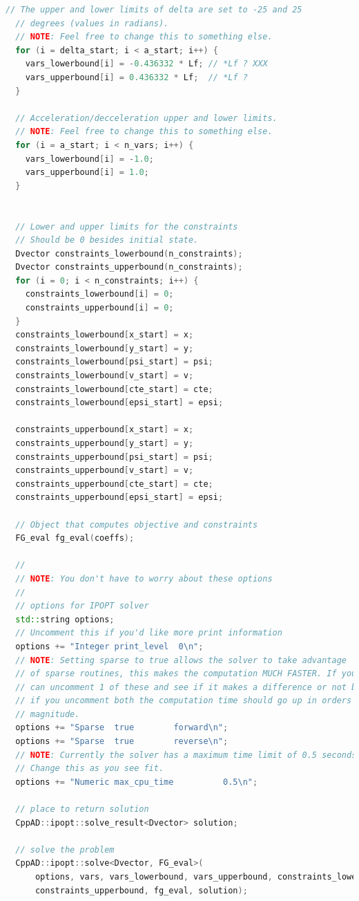 \documentclass[11pt]{article}
\begin{document}
\begin{lstlisting}[language=C++, caption={MPC solver with ipopt}]
  // The upper and lower limits of delta are set to -25 and 25
  // degrees (values in radians).
  // NOTE: Feel free to change this to something else.
  for (i = delta_start; i < a_start; i++) {
    vars_lowerbound[i] = -0.436332 * Lf; // *Lf ? XXX
    vars_upperbound[i] = 0.436332 * Lf;  // *Lf ?
  }

  // Acceleration/decceleration upper and lower limits.
  // NOTE: Feel free to change this to something else.
  for (i = a_start; i < n_vars; i++) {
    vars_lowerbound[i] = -1.0;
    vars_upperbound[i] = 1.0;
  }


  // Lower and upper limits for the constraints
  // Should be 0 besides initial state.
  Dvector constraints_lowerbound(n_constraints);
  Dvector constraints_upperbound(n_constraints);
  for (i = 0; i < n_constraints; i++) {
    constraints_lowerbound[i] = 0;
    constraints_upperbound[i] = 0;
  }
  constraints_lowerbound[x_start] = x;
  constraints_lowerbound[y_start] = y;
  constraints_lowerbound[psi_start] = psi;
  constraints_lowerbound[v_start] = v;
  constraints_lowerbound[cte_start] = cte;
  constraints_lowerbound[epsi_start] = epsi;

  constraints_upperbound[x_start] = x;
  constraints_upperbound[y_start] = y;
  constraints_upperbound[psi_start] = psi;
  constraints_upperbound[v_start] = v;
  constraints_upperbound[cte_start] = cte;
  constraints_upperbound[epsi_start] = epsi;

  // Object that computes objective and constraints
  FG_eval fg_eval(coeffs);

  //
  // NOTE: You don't have to worry about these options
  //
  // options for IPOPT solver
  std::string options;
  // Uncomment this if you'd like more print information
  options += "Integer print_level  0\n";
  // NOTE: Setting sparse to true allows the solver to take advantage
  // of sparse routines, this makes the computation MUCH FASTER. If you
  // can uncomment 1 of these and see if it makes a difference or not but
  // if you uncomment both the computation time should go up in orders of
  // magnitude.
  options += "Sparse  true        forward\n";
  options += "Sparse  true        reverse\n";
  // NOTE: Currently the solver has a maximum time limit of 0.5 seconds.
  // Change this as you see fit.
  options += "Numeric max_cpu_time          0.5\n";

  // place to return solution
  CppAD::ipopt::solve_result<Dvector> solution;

  // solve the problem
  CppAD::ipopt::solve<Dvector, FG_eval>(
      options, vars, vars_lowerbound, vars_upperbound, constraints_lowerbound,
      constraints_upperbound, fg_eval, solution);


\end{lstlisting}
\end{document}
